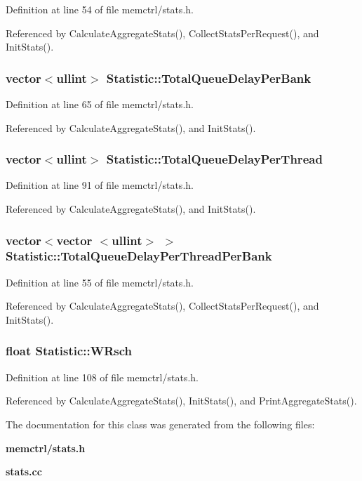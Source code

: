 Definition at line 54 of file memctrl/stats.h.

Referenced by CalculateAggregateStats(), CollectStatsPerRequest(), and InitStats().
\subsubsection[{TotalQueueDelayPerBank}]{\setlength{\rightskip}{0pt plus 5cm}vector$<${\bf ullint}$>$ {\bf Statistic::TotalQueueDelayPerBank}}\label{classStatistic_8991d576547b609cafad951a528d5890}




Definition at line 65 of file memctrl/stats.h.

Referenced by CalculateAggregateStats(), and InitStats().
\subsubsection[{TotalQueueDelayPerThread}]{\setlength{\rightskip}{0pt plus 5cm}vector$<${\bf ullint}$>$ {\bf Statistic::TotalQueueDelayPerThread}}\label{classStatistic_978813b20ca47eb177c096761085cefa}




Definition at line 91 of file memctrl/stats.h.

Referenced by CalculateAggregateStats(), and InitStats().
\subsubsection[{TotalQueueDelayPerThreadPerBank}]{\setlength{\rightskip}{0pt plus 5cm}vector$<$vector $<${\bf ullint}$>$ $>$ {\bf Statistic::TotalQueueDelayPerThreadPerBank}}\label{classStatistic_60639123bb1bb247f037072062f4942f}




Definition at line 55 of file memctrl/stats.h.

Referenced by CalculateAggregateStats(), CollectStatsPerRequest(), and InitStats().
\subsubsection[{WRsch}]{\setlength{\rightskip}{0pt plus 5cm}float {\bf Statistic::WRsch}}\label{classStatistic_b91c934d989c9590e053baee3939aeb4}




Definition at line 108 of file memctrl/stats.h.

Referenced by CalculateAggregateStats(), InitStats(), and PrintAggregateStats().

The documentation for this class was generated from the following files:\begin{CompactItemize}
\item 
{\bf memctrl/stats.h}\item 
{\bf stats.cc}\end{CompactItemize}
